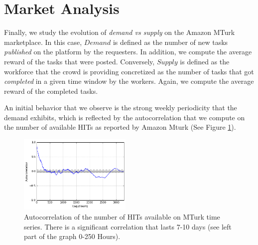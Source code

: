 \section{Market Analysis}
\label{sec:market}
Finally, we study the evolution of \emph{demand vs supply} on the Amazon MTurk marketplace.
In this case, $Demand$ is defined as the number of new tasks \emph{published} on the platform by the requesters.
In addition, we compute the average reward of the tasks that were posted.
Conversely, $Supply$ is defined as the workforce that the crowd is providing concretized as the number of tasks that got \emph{completed} in a given time window by the workers.
Again, we compute the average reward of the completed tasks.

An initial behavior that we observe is the strong weekly periodicity that the demand exhibits, which is reflected by the autocorrelation that we compute on the number of available HITs as reported by Amazon Mturk (See Figure \ref{fig:autocorrelation1}).
\begin{figure}[tb]
	\centering
		\includegraphics[width=0.48\textwidth]{figures/autocorrelation_plot}
	\caption{Autocorrelation of the number of HITs available on MTurk time series.
There is a significant correlation that lasts 7-10 days (see left part of the graph 0-250 Hours).}
	\label{fig:autocorrelation1}
\end{figure}

